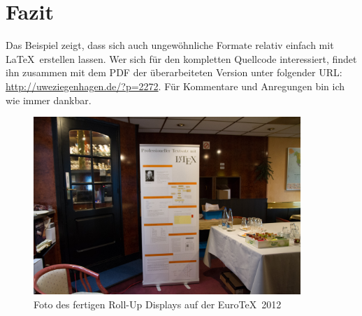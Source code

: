 \documentclass[12pt,ngerman]{dtk}
\begin{document}
\section{Fazit}

Das Beispiel zeigt, dass sich auch ungewöhnliche Formate relativ einfach mit \LaTeX\ erstellen lassen. Wer sich für den kompletten Quellcode interessiert, findet ihn zusammen mit dem PDF der überarbeiteten Version unter folgender URL: \url{http://uweziegenhagen.de/?p=2272}. Für Kommentare und Anregungen bin ich wie immer dankbar.

\begin{figure}
\centering
\includegraphics[width=0.9\textwidth]{IMG_2562}
\caption{Foto des fertigen Roll-Up Displays auf der Euro\TeX\ 2012}
\end{figure}
\end{document}
